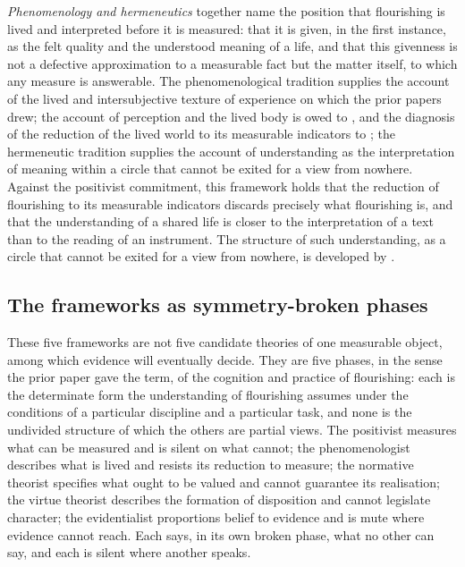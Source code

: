 \emph{Phenomenology and hermeneutics} together name the position that flourishing is lived and interpreted before it is measured: that it is given, in the first instance, as the felt quality and the understood meaning of a life, and that this givenness is not a defective approximation to a measurable fact but the matter itself, to which any measure is answerable. The phenomenological tradition supplies the account of the lived and intersubjective texture of experience on which the prior papers drew; the account of perception and the lived body is owed to \textcite{merleau1945}, and the diagnosis of the reduction of the lived world to its measurable indicators to \textcite{husserl1936}; the hermeneutic tradition supplies the account of understanding as the interpretation of meaning within a circle that cannot be exited for a view from nowhere. Against the positivist commitment, this framework holds that the reduction of flourishing to its measurable indicators discards precisely what flourishing is, and that the understanding of a shared life is closer to the interpretation of a text than to the reading of an instrument. The structure of such understanding, as a circle that cannot be exited for a view from nowhere, is developed by \textcite{gadamer1960}.

\subsection{The frameworks as symmetry-broken phases}
\label{p11:sec:bg-phases}

These five frameworks are not five candidate theories of one measurable object, among which evidence will eventually decide. They are five phases, in the sense the prior paper gave the term, of the cognition and practice of flourishing: each is the determinate form the understanding of flourishing assumes under the conditions of a particular discipline and a particular task, and none is the undivided structure of which the others are partial views. The positivist measures what can be measured and is silent on what cannot; the phenomenologist describes what is lived and resists its reduction to measure; the normative theorist specifies what ought to be valued and cannot guarantee its realisation; the virtue theorist describes the formation of disposition and cannot legislate character; the evidentialist proportions belief to evidence and is mute where evidence cannot reach. Each says, in its own broken phase, what no other can say, and each is silent where another speaks.

